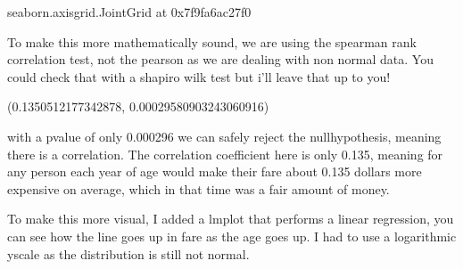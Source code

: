 \documentclass[letterpaper,10pt,english]{jupyterBook}
\begin{document}
\begin{sphinxVerbatim}[commandchars=\\\{\}]
\PYGZlt{}seaborn.axisgrid.JointGrid at 0x7f9fa6ac27f0\PYGZgt{}
\end{sphinxVerbatim}

\noindent{}

\sphinxAtStartPar
To make this more mathematically sound, we are using the spearman rank correlation test, not the pearson as we are dealing with non normal data. You could check that with a shapiro wilk test but i’ll leave that up to you!

\begin{sphinxVerbatim}[commandchars=\\\{\}]
   \PYG{p}{[}\PYG{p}{[}\PYG{p}{]}\PYG{p}{]}
 
\end{sphinxVerbatim}

\begin{sphinxVerbatim}[commandchars=\\\{\}]
(0.1350512177342878, 0.00029580903243060916)
\end{sphinxVerbatim}

\sphinxAtStartPar
with a p\sphinxhyphen{}value of only 0.000296 we can safely reject the null\sphinxhyphen{}hypothesis, meaning there is a correlation.
The correlation coefficient here is only 0.135, meaning for any person each year of age would make their fare about 0.135 dollars more expensive on average, which in that time was a fair amount of money.

\sphinxAtStartPar
To make this more visual, I added a lmplot that performs a linear regression, you can see how the line goes up in fare as the age goes up.
I had to use a logarithmic y\sphinxhyphen{}scale as the distribution is still not normal.

\begin{sphinxVerbatim}[commandchars=\\\{\}]
    
\end{sphinxVerbatim}
\end{document}
